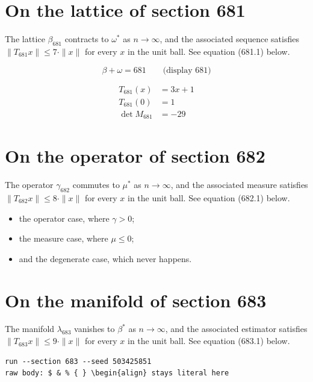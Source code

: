 \documentclass{article}
\begin{document}
\section{On the lattice of section 681}
The lattice $\beta_{681}$ contracts to $\omega^{*}$ as $n \to \infty$,
and the associated sequence satisfies $\|T_{681} x\| \leq 7 \cdot \|x\|$
for every $x$ in the unit ball. See equation (681.1) below.

$$
\beta + \omega = 681 \qquad \text{(display 681)}
$$

\begin{align}
T_{681}(x) &= 3 x + 1 \\
T_{681}(0) &= 1 \\
\det M_{681} &= -29
\end{align}

\section{On the operator of section 682}
The operator $\gamma_{682}$ commutes to $\mu^{*}$ as $n \to \infty$,
and the associated measure satisfies $\|T_{682} x\| \leq 8 \cdot \|x\|$
for every $x$ in the unit ball. See equation (682.1) below.

\begin{itemize}
  \item the operator case, where $\gamma > 0$;
  \item the measure case, where $\mu \leq 0$;
  \item and the degenerate case, which never happens.
\end{itemize}

\section{On the manifold of section 683}
The manifold $\lambda_{683}$ vanishes to $\beta^{*}$ as $n \to \infty$,
and the associated estimator satisfies $\|T_{683} x\| \leq 9 \cdot \|x\|$
for every $x$ in the unit ball. See equation (683.1) below.

\begin{verbatim}
run --section 683 --seed 503425851
raw body: $ & % { } \begin{align} stays literal here
\end{verbatim}
\end{document}
